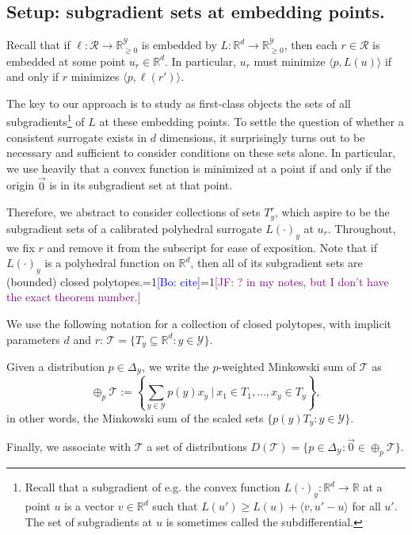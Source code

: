 \documentclass[anon]{colt2020} %
\newcommand{\Comments}{1}
\newcommand{\mynote}[2]{\ifnum\Comments=1\textcolor{#1}{#2}\fi}
\newcommand{\jessie}[1]{\mynote{purple}{[JF: #1]}}
\newcommand{\bo}[1]{\mynote{blue}{[Bo: #1]}}
\newcommand{\reals}{\mathbb{R}}
\newcommand{\nonnegreals}{\reals_{\geq 0}}%
\newcommand{\simplex}{\Delta_\Y}
\newcommand{\R}{\mathcal{R}}
\newcommand{\T}{\mathcal{T}}
\newcommand{\Y}{\mathcal{Y}}
\newcommand{\inprod}[2]{\langle #1, #2 \rangle}%
\begin{document}
\subsection{Setup: subgradient sets at embedding points.}\label{subsec:sub-sets}

Recall that if $\ell: \R \to \nonnegreals^{\Y}$ is embedded by $L: \reals^d \to \nonnegreals^{\Y}$, then each $r \in \R$ is embedded at some point $u_r \in \reals^d$.
In particular, $u_r$ must minimize $\inprod{p}{L(u)}$ if and only if $r$ minimizes $\inprod{p}{\ell(r')}$.

The key to our approach is to study as first-class objects the sets of all subgradients\footnote{Recall that a subgradient of e.g. the convex function $L(\cdot)_y: \reals^d \to \reals$ at a point $u$ is a vector $v \in \reals^d$ such that $L(u') \geq L(u) + \inprod{v}{u'-u}$ for all $u'$. The set of subgradients at $u$ is sometimes called the subdifferential.} of $L$ at these embedding points.
To settle the question of whether a consistent surrogate exists in $d$ dimensions, it surprisingly turns out to be necessary and sufficient to consider conditions on these sets alone.
In particular, we use heavily that a convex function is minimized at a point if and only if the origin $\vec{0}$ is in its subgradient set at that point.

Therefore, we abstract to consider collections of sets $T^r_y$, which aspire to be the subgradient sets of a calibrated polyhedral surrogate $L(\cdot)_y$ at $u_r$.
Throughout, we fix $r$ and remove it from the subscript for ease of exposition.
Note that if $L(\cdot)_y$ is a polyhedral function on $\reals^d$, then all of its subgradient sets are (bounded) closed polytopes.\bo{cite}\jessie{\cite{rockafellar1997convex} ? in my notes, but I don't have the exact theorem number.}

\begin{definition}[$\T$, $D(\T)$]
  We use the following notation for a collection of closed polytopes, with implicit parameters $d$ and $r$: $\T = \{T_y \subseteq \reals^d : y \in \Y\}$.

  Given a distribution $p \in \simplex$, we write the $p$-weighted Minkowski sum of $\T$ as
    \[ \oplus_p \T := \left\{ \sum_{y \in \Y} p(y) x_y ~\Big|~ x_1 \in T_1, \dots, x_y \in T_y \right\} , \]
  in other words, the Minkowski sum of the scaled sets $\{p(y) T_y : y \in \Y\}$.

  Finally, we associate with $\T$ a set of distributions $D(\T) = \{ p \in \simplex : \vec 0 \in \oplus_p \T\}$.
\end{definition}
\end{document}
